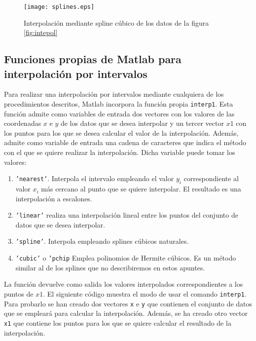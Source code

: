 \begin{figure}[h]
\centering
\texttt{[image: splines.eps]}
\caption{Interpolación mediante spline cúbico de los datos de la figura \ref{fig:intepol}} 
\label{fig:splines}
\end{figure} 
 
\begin{paracol}{2} 
\subsection{Funciones propias de Matlab para interpolación por intervalos} 

Para realizar una interpolación por intervalos mediante cualquiera de los procedimientos descritos, Matlab incorpora la función propia \texttt{interp1}. Esta función admite como variables de entrada dos vectores con los valores de las coordenadas $x$ e $y$ de los datos que se desea interpolar y un tercer vector $x1$ con los puntos para los que se desea calcular el valor de la interpolación. Además, admite como variable  de entrada una cadena de caracteres que indica el método con el que se quiere realizar la interpolación. Dicha variable puede tomar los valores:
\begin{enumerate}
\item \texttt{'nearest'}. Interpola el intervalo empleando el valor $y_i$ correspondiente al valor  $x_i$ más cercano al punto que se quiere interpolar. El resultado es una interpolación a escalones.
\item \texttt{'linear'} realiza una interpolación lineal entre los puntos del conjunto de datos que se desea interpolar.
\item \texttt{'spline'}. Interpola empleando splines cúbicos naturales.
\item \texttt{'cubic'} o \texttt{'pchip} Emplea polinomios de Hermite cúbicos. Es un método similar al de los splines que no describiremos en estos apuntes.
\end{enumerate} 

La función devuelve como salida los valores interpolados correspondientes a los puntos de $x1$. El siguiente código muestra el modo de usar el comando \texttt{interp1}. Para probarlo se han creado dos vectores \texttt{x} e \texttt{y} que contienen el conjunto de datos que se empleará para calcular la interpolación. Además, se ha creado otro vector \texttt{x1} que contiene los puntos para los que se quiere calcular el resultado de la interpolación.
\end{paracol}
